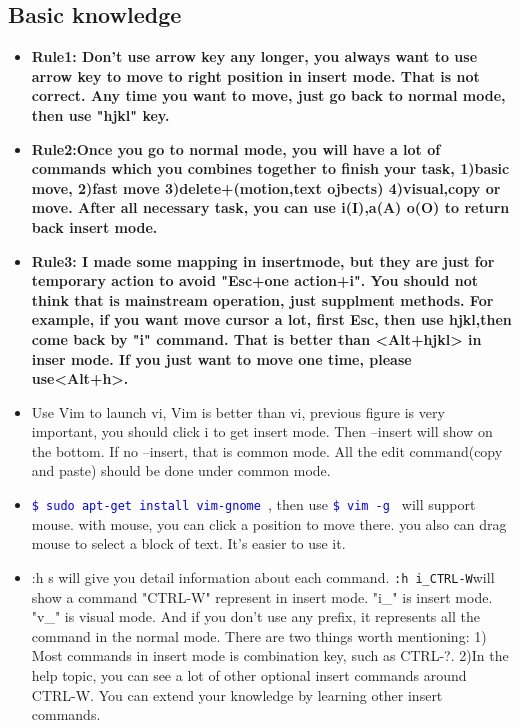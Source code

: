 \documentclass[a4paper,12pt,twoside]{book}
\newcommand{\linuxcommand}[1]{\texttt{\textcolor{blue}{\$ #1 \Pisymbol{psy}{191}}}}
\begin{document}
\subsection{Basic knowledge}

\begin{itemize}
		\item \textbf{Rule1: Don't use arrow key any longer, you always want to use arrow key to move to right position in insert mode. That is not correct. Any time you want to move, just go back to normal mode, then use "hjkl" key.}
		\item \textbf{Rule2:Once you go to normal mode, you will have a lot of commands which you combines together to finish your task, 1)basic move, 2)fast move 3)delete+(motion,text ojbects) 4)visual,copy or move. After all necessary task, you can use i(I),a(A) o(O) to return back insert mode.}
		\item \textbf{Rule3: I made some mapping in insertmode, but they are just for temporary action to avoid "Esc+one action+i". You should not think that is mainstream operation, just supplment methods. For example, if you want move cursor a lot, first Esc, then use hjkl,then come back by "i" command. That is better than <Alt+hjkl> in inser mode. If you just want to move one time, please use<Alt+h>.}

\item Use Vim to launch vi, Vim is better than vi, previous figure is very important, you should click i to get insert mode. Then --insert will show on the bottom. If no --insert, that is common mode. All the edit command(copy and paste) should be done under common mode. 

\item \linuxcommand{sudo apt-get install vim-gnome}, then use \linuxcommand{vim -g} will support mouse.  with mouse, you can click a position to move there. you also can drag mouse to select a block of text. It's easier to use it. 

\item :h s will give you detail information about each command. \verb=:h i_CTRL-W=will show a command "CTRL-W" represent in insert mode. "i\_" is insert mode. "v\_" is visual mode. And if you don't use any prefix, it represents all the command in the normal mode. There are two things worth mentioning: 1) Most commands in insert mode is combination key, such as CTRL-?. 2)In the help topic, you can see a lot of other optional insert commands around CTRL-W. You can extend your knowledge by learning other insert commands.


\end{itemize}
\end{document}
